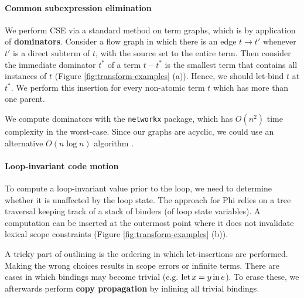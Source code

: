 \vspace{-1em}
\paragraph{Common subexpression elimination} We perform CSE via a standard method on term graphs, which is by application of \textbf{dominators}. Consider a flow graph in which there is an edge $t \to t'$ whenever $t'$ is a direct subterm of $t$, with the source set to the entire term. Then consider the immediate dominator $t^*$ of a term $t$ -- $t^*$ is the smallest term that contains all instances of $t$ (Figure \ref{fig:transform-examples} (a)). Hence, we should let-bind $t$ at $t^*$. We perform this insertion for every non-atomic term $t$ which has more than one parent. 

We compute dominators with the \texttt{networkx} package, which has $O(n^2)$ time complexity in the worst-case. Since our graphs are acyclic, we could use an alternative $O(n \log n)$ algorithm \cite{ramalingam1994incremental}.

\vspace{-1em}
\paragraph{Loop-invariant code motion} To compute a loop-invariant value prior to the loop, we need to determine whether it is unaffected by the loop state. The approach for Phi relies on a tree traversal keeping track of a stack of binders (of loop state variables). A computation can be inserted at the outermost point where it does not invalidate lexical scope constraints (Figure \ref{fig:transform-examples} (b)).

A tricky part of outlining is the ordering in which let-insertions are performed. Making the wrong choices results in scope errors or infinite terms. 
There are cases in which bindings may become trivial (e.g. $\mathrm{let}\,{x}={y}\,\mathrm{in}\,{e}$). To erase these, we afterwards perform \textbf{copy propagation} by inlining all trivial bindings.



